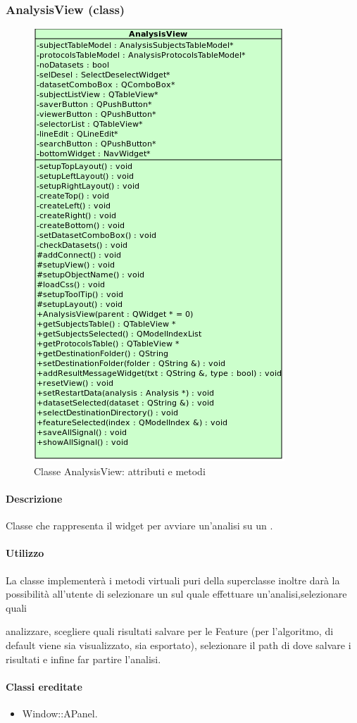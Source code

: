 \subsubsection{AnalysisView (class)}
\label{speanaV}
\begin{figure}[!h]
\centering
			\includegraphics[width=0.5\linewidth]{./Content/Immagini/view/AnalysisView.png}
			\caption{Classe AnalysisView: attributi e metodi}
			\label{cl_anaview}
\end{figure}
\paragraph{Descrizione \\}
Classe che rappresenta il widget per avviare un'analisi su un \dataset{}.
\paragraph{Utilizzo\\}
La classe implementerà i metodi virtuali puri della superclasse inoltre darà la possibilità all'utente di selezionare un \dataset{} sul quale effettuare un'analisi,selezionare quali \subject{} analizzare, scegliere quali risultati salvare per le Feature\g{} (per l'algoritmo, di default viene sia visualizzato, sia esportato), selezionare il path di dove salvare i risultati e infine far partire l'analisi.
\paragraph{Classi ereditate\\}
\begin{itemize}
\item Window::APanel.
\end{itemize}

